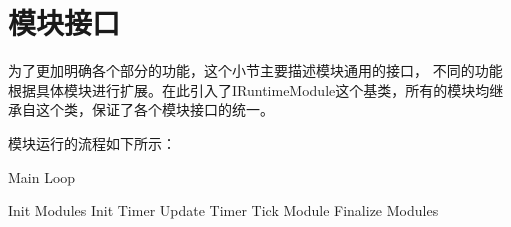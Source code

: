 \section{模块接口}

为了更加明确各个部分的功能，这个小节主要描述模块通用的接口，
不同的功能根据具体模块进行扩展。在此引入了IRuntimeModule这个基类，所有的模块均继承自这个类，保证了各个模块接口的统一。



模块运行的流程如下所示：

\begin{breakablealgorithm}
\caption{Main Loop}
\label{mainloop function}
\begin{algorithmic}
    \State Init Modules
    \State Init Timer
        \State Update Timer
        \State Tick Module
    \EndWhile
    \State Finalize Modules
\EndProcedure
\end{algorithmic}
\end{breakablealgorithm}
